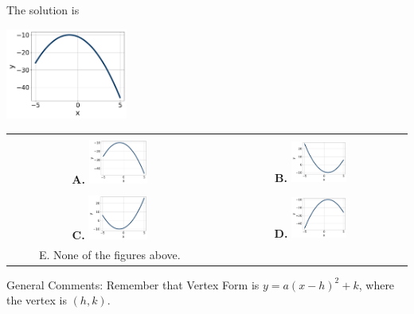 \documentclass{article}[14pt]
\begin{document}
 
 The solution is  
 \begin{center} \includegraphics[width=0.3\textwidth]{../Figures/quadraticEquationToGraphAB.png} \end{center}\begin{tabular}{|c|c|} 
\hline 
 & \tabularnewline 
 \textbf{A.} \includegraphics[width=0.3\textwidth]{../Figures/quadraticEquationToGraphAB.png} & \textbf{B.} \includegraphics[width=0.3\textwidth]{../Figures/quadraticEquationToGraphBB.png} \tabularnewline 
\hline 
 & \tabularnewline 
 \textbf{C.} \includegraphics[width=0.3\textwidth]{../Figures/quadraticEquationToGraphCB.png} & \textbf{D.} \includegraphics[width=0.3\textwidth]{../Figures/quadraticEquationToGraphDB.png} \tabularnewline 
\hline 
 E. None of the figures above. & \tabularnewline 
\hline 
 \end{tabular} 
 
General Comments: Remember that Vertex Form is $y = a(x-h)^2+k$, where the vertex is $(h, k)$.
\end{document}
